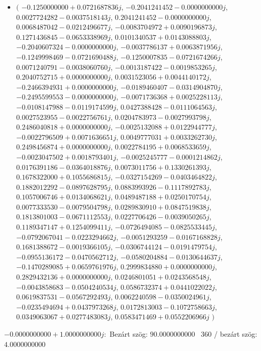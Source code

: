 \documentclass[14pt,a4paper]{article}
\begin{document}
\begin{itemize}
\item
$\big($
$-0.1250000000+0.0721687836j$, $-0.2041241452-0.0000000000j$, $0.0027724282-0.0037518143j$, $0.2041241452-0.0000000000j$, $0.0068487042-0.0212496677j$, $-0.0083704972+0.0090196873j$, $0.1271436845-0.0653338969j$, $0.0101340537+0.0143088803j$, $-0.2040607324-0.0000000000j$, $-0.0037786137+0.0063871956j$, $-0.1249998469-0.0721690488j$, $-0.1250007835-0.0721674266j$, $0.0071240791-0.0038060760j$, $-0.0013187422-0.0019853265j$, $0.2040752715+0.0000000000j$, $0.0031523056+0.0044140172j$, $-0.2466394931+0.0000000000j$, $-0.0189460407-0.0314904870j$, $-0.2495599553-0.0000000000j$, $-0.0071736368+0.0025228113j$, $-0.0108147988-0.0119174599j$, $0.0427388428-0.0111064563j$, $0.0027523955-0.0022756761j$, $0.0204783973-0.0027993798j$, $0.2486040818+0.0000000000j$, $-0.0025132088+0.0122944777j$, $-0.0022796509+0.0071636651j$, $0.0049777031+0.0033262730j$, $0.2498456874+0.0000000000j$, $0.0022784195+0.0068533659j$, $-0.0023047502+0.0018793401j$, $-0.0025245777-0.0001214862j$, $0.0176391186-0.0364018876j$, $0.0073011756+0.1330261393j$, $0.1678322000+0.1055686815j$, $-0.0327154269-0.0403464822j$, $0.1882012292-0.0897628795j$, $0.0883993926-0.1117892783j$, $0.1057006746+0.0134068621j$, $0.0489487188+0.0250170754j$, $0.0077333530-0.0079504798j$, $0.0289830910+0.0847519838j$, $0.1813801003-0.0671112553j$, $0.0227706426-0.0039050265j$, $0.1189347147+0.1254099411j$, $-0.0726494085-0.0825533445j$, $-0.0792067041-0.0223294662j$, $-0.0051293259-0.0167168828j$, $0.1681388672-0.0019366105j$, $-0.0306744124-0.0191479754j$, $-0.0955136172-0.0470562712j$, $-0.0580204884-0.0130644637j$, $-0.1470289085+0.0659761976j$, $0.2999834880+0.0000000000j$, $0.2829432136+0.0000000000j$, $0.0246801051+0.0243568548j$, $-0.0043858683-0.0504240534j$, $0.0586732374+0.0441022022j$, $0.0619837531-0.0567292493j$, $0.0062240598-0.0350024961j$, $-0.0235494694+0.0437973268j$, $0.0172813003-0.1072758663j$, $0.0349063067+0.0277483083j$, $0.0583471469+0.0552206966j$
$\big)$
\end{itemize}
$-0.0000000000+1.0000000000j$:\
Bezárt szög: $90.0000000000$ \
360 / bezárt szög: $4.0000000000$\
\end{document}

